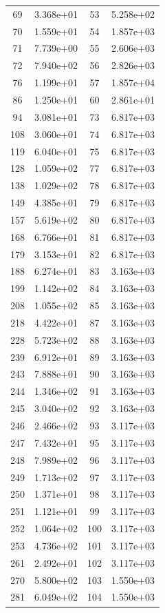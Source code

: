 \documentclass[12pt]{article}
\begin{document}
\begin{longtable}{@{}cccc@{}}
69 & 3.368e+01 & 53 & 5.258e+02 \\
70 & 1.559e+01 & 54 & 1.857e+03 \\
71 & 7.739e+00 & 55 & 2.606e+03 \\
72 & 7.940e+02 & 56 & 2.826e+03 \\
76 & 1.199e+01 & 57 & 1.857e+04 \\
86 & 1.250e+01 & 60 & 2.861e+01 \\
94 & 3.081e+01 & 73 & 6.817e+03 \\
108 & 3.060e+01 & 74 & 6.817e+03 \\
119 & 6.040e+01 & 75 & 6.817e+03 \\
128 & 1.059e+02 & 77 & 6.817e+03 \\
138 & 1.029e+02 & 78 & 6.817e+03 \\
149 & 4.385e+01 & 79 & 6.817e+03 \\
157 & 5.619e+02 & 80 & 6.817e+03 \\
168 & 6.766e+01 & 81 & 6.817e+03 \\
179 & 3.153e+01 & 82 & 6.817e+03 \\
188 & 6.274e+01 & 83 & 3.163e+03 \\
199 & 1.142e+02 & 84 & 3.163e+03 \\
208 & 1.055e+02 & 85 & 3.163e+03 \\
218 & 4.422e+01 & 87 & 3.163e+03 \\
228 & 5.723e+02 & 88 & 3.163e+03 \\
239 & 6.912e+01 & 89 & 3.163e+03 \\
243 & 7.888e+01 & 90 & 3.163e+03 \\
244 & 1.346e+02 & 91 & 3.163e+03 \\
245 & 3.040e+02 & 92 & 3.163e+03 \\
246 & 2.466e+02 & 93 & 3.117e+03 \\
247 & 7.432e+01 & 95 & 3.117e+03 \\
248 & 7.989e+02 & 96 & 3.117e+03 \\
249 & 1.713e+02 & 97 & 3.117e+03 \\
250 & 1.371e+01 & 98 & 3.117e+03 \\
251 & 1.121e+01 & 99 & 3.117e+03 \\
252 & 1.064e+02 & 100 & 3.117e+03 \\
253 & 4.736e+02 & 101 & 3.117e+03 \\
261 & 2.492e+01 & 102 & 3.117e+03 \\
270 & 5.800e+02 & 103 & 1.550e+03 \\
281 & 6.049e+02 & 104 & 1.550e+03 \\

\end{longtable}
\end{document}
